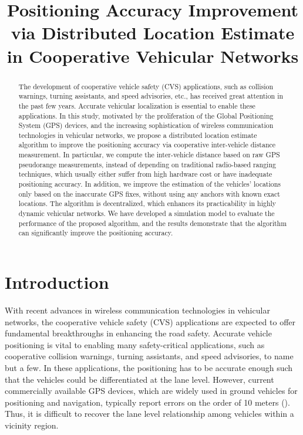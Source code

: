 \documentclass[letterpaper, 10 pt, conference]{ieeeconf}
\title{\LARGE \bf
Positioning Accuracy Improvement via Distributed Location Estimate in Cooperative Vehicular Networks}
\author{\authorblockN{Kai Liu,
Hock Beng Lim}
\authorblockA{Intelligent Systems Centre\\
Nanyang Technological University, Singapore
\\ Email: \{liukai, hblim\}@ntu.edu.sg}
}
\begin{document}
\maketitle
\thispagestyle{empty}
\pagestyle{empty}



\begin{abstract}
The development of cooperative vehicle safety (CVS) applications, such as collision warnings, turning assistants, and speed advisories, etc., has received great attention in the past few years. Accurate vehicular localization is  essential to enable these applications. In this study, motivated by the proliferation of the Global Positioning System (GPS) devices, and the increasing sophistication of wireless communication technologies in vehicular networks, we propose a distributed location estimate algorithm to improve the positioning accuracy via cooperative inter-vehicle distance measurement. In particular, we compute the inter-vehicle distance based on raw GPS pseudorange measurements, instead of depending on traditional radio-based ranging techniques, which usually either suffer from  high hardware cost or have inadequate positioning accuracy. In addition, we improve the estimation of the vehicles' locations only based on the inaccurate GPS fixes, without using any anchors with known exact locations. The algorithm is decentralized, which enhances its practicability in highly dynamic vehicular networks. We have developed a simulation model to evaluate the performance of the proposed algorithm, and the results demonstrate that the algorithm can significantly improve the positioning accuracy.
\end{abstract}



\section{Introduction}

With recent advances in wireless communication technologies in vehicular networks, the cooperative vehicle safety (CVS) applications are expected to offer fundamental breakthroughs in enhancing the road safety. Accurate vehicle positioning is vital to enabling  many safety-critical applications, such as cooperative collision warnings, turning assistants, and speed advisories, to name but a few. In these applications, the positioning has to be accurate enough such that the vehicles could be differentiated at the lane level. However, current commercially available GPS devices, which are widely used in ground vehicles for positioning and navigation, typically report errors on the order of 10 meters (\cite{boukerche2008vehicular, schubert2007accurate}). Thus, it is difficult to recover the lane level relationship among vehicles within a vicinity region.
\end{document}
